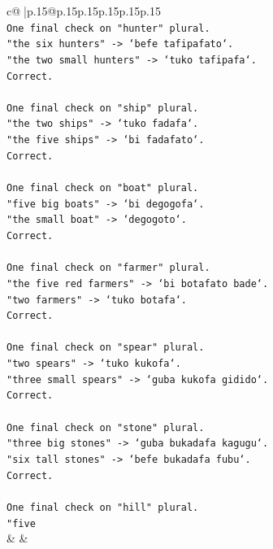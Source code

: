 \documentclass{article}
\begin{document}
{\begin{supertabular}{c@{$\;$}|p{.15\linewidth}@{}p{.15\linewidth}p{.15\linewidth}p{.15\linewidth}p{.15\linewidth}p{.15\linewidth}}
{{{\\ 
\texttt{One final check on "hunter" plural.} \\
\texttt{"the six hunters" {-}> `befe tafipafato`.} \\
\texttt{"the two small hunters" {-}> `tuko tafipafa`.} \\
\texttt{Correct.} \\
\\ 
\texttt{One final check on "ship" plural.} \\
\texttt{"the two ships" {-}> `tuko fadafa`.} \\
\texttt{"the five ships" {-}> `bi fadafato`.} \\
\texttt{Correct.} \\
\\ 
\texttt{One final check on "boat" plural.} \\
\texttt{"five big boats" {-}> `bi degogofa`.} \\
\texttt{"the small boat" {-}> `degogoto`.} \\
\texttt{Correct.} \\
\\ 
\texttt{One final check on "farmer" plural.} \\
\texttt{"the five red farmers" {-}> `bi botafato bade`.} \\
\texttt{"two farmers" {-}> `tuko botafa`.} \\
\texttt{Correct.} \\
\\ 
\texttt{One final check on "spear" plural.} \\
\texttt{"two spears" {-}> `tuko kukofa`.} \\
\texttt{"three small spears" {-}> `guba kukofa gidido`.} \\
\texttt{Correct.} \\
\\ 
\texttt{One final check on "stone" plural.} \\
\texttt{"three big stones" {-}> `guba bukadafa kagugu`.} \\
\texttt{"six tall stones" {-}> `befe bukadafa fubu`.} \\
\texttt{Correct.} \\
\\ 
\texttt{One final check on "hill" plural.} \\
\texttt{"five} \\
            }
        }
    }
    & & \\ \\


\end{supertabular}}
\end{document}
